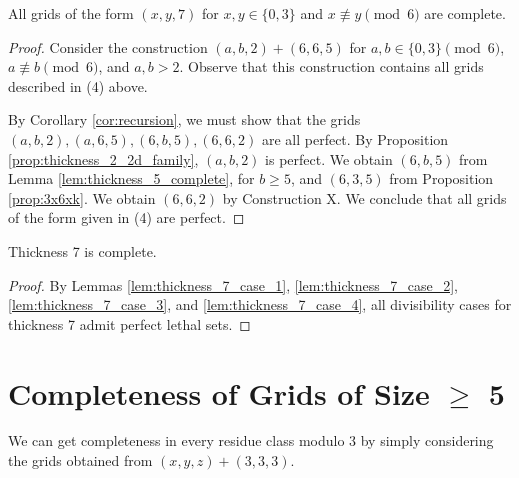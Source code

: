 \begin{lem}
\label{lem:thickness_7_case_4}
All grids of the form $(x,y,7)$ for $x,y \in \{0,3\}$ and $x \not\equiv y \pmod 6$ are complete.
\end{lem}

\begin{proof}
Consider the construction $(a,b,2) + (6,6,5)$ for $a,b \in \{0,3\} \pmod 6$, $a \not\equiv b \pmod 6$, and $a,b > 2$. Observe that this construction contains all grids described in (4) above. 

By Corollary \ref{cor:recursion}, we must show that the grids $(a,b,2), (a,6,5), (6,b,5), (6,6,2)$ are all perfect. By Proposition \ref{prop:thickness_2_2d_family}, $(a,b,2)$ is perfect. We obtain $(6,b,5)$ from Lemma \ref{lem:thickness_5_complete}, for $b \geq 5$, and $(6,3,5)$ from Proposition \ref{prop:3x6xk}. We obtain $(6,6,2)$ by Construction X. We conclude that all grids of the form given in (4) are perfect.
\end{proof}

\begin{lem}
Thickness 7 is complete.
\end{lem}

\begin{proof}
By Lemmas \ref{lem:thickness_7_case_1}, \ref{lem:thickness_7_case_2}, \ref{lem:thickness_7_case_3}, and \ref{lem:thickness_7_case_4}, all divisibility cases for thickness 7 admit perfect lethal sets.
\end{proof}

\section{Completeness of Grids of Size $\geq$ 5}

We can get completeness in every residue class modulo 3 by simply considering the grids obtained from $(x,y,z)+(3,3,3)$.




